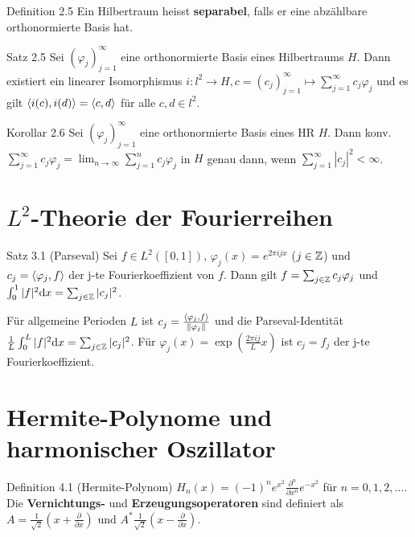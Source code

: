 \begin{namedtheorem}{Definition 2.5}
  Ein Hilbertraum heisst \textbf{separabel}, falls er eine abzählbare orthonormierte Basis hat.
\end{namedtheorem}

\begin{namedtheorem}{Satz 2.5}
  Sei $(\varphi_j)_{j=1}^{\infty}$ eine orthonormierte Basis eines Hilbertraums $H$. Dann existiert ein linearer Isomorphismus $i:l^2\rightarrow H,c=(c_j)_{j=1}^{\infty}\mapsto\sum_{j=1}^{\infty}c_j\varphi_j$ und es gilt $\langle i(c),i(d) \rangle=\langle c,d \rangle$ für alle $c,d\in l^2$. 
\end{namedtheorem}

\begin{namedtheorem}{Korollar 2.6}
  Sei $(\varphi_j)_{j=1}^{\infty}$ eine orthonormierte Basis eines HR $H$. Dann konv. $\sum_{j=1}^{\infty}c_j\varphi_j=\lim_{n\rightarrow\infty}\sum_{j=1}^nc_j\varphi_j$ in $H$ genau dann, wenn $\sum_{j=1}^{\infty}|c_j|^2<\infty$.
\end{namedtheorem}

\section{$L^2$-Theorie der Fourierreihen}

\begin{namedtheorem}{Satz 3.1 (Parseval)}
  Sei $f\in L^2([0,1])$, $\varphi_j(x) = e^{2\pi ijx}$ ($j\in\mathbb{Z}$) und $c_j=\langle \varphi_j,f \rangle$ der j-te Fourierkoeffizient von $f$. Dann gilt $f=\sum_{j\in\mathbb{Z}}c_j\varphi_j$ und $\int_0^1|f|^2\mathrm{d} x = \sum_{j\in\mathbb{Z}}|c_j|^2$.
\end{namedtheorem}

Für allgemeine Perioden $L$ ist $c_j=\frac{\langle \varphi_j,f \rangle}{\lVert\varphi_j\rVert}$ und die Parseval-Identität $\frac1L\int_{0}^{L}|f|^2\mathrm{d} x = \sum_{j\in\mathbb{Z}}|c_j|^2$. Für $\varphi_j(x)=\exp(\frac{2\pi i j}{L}x)$ ist $c_j=f_j$ der j-te Fourierkoeffizient.

\section{Hermite-Polynome und harmonischer Oszillator}

\begin{namedtheorem}{Definition 4.1 (Hermite-Polynom)}
  $H_n(x) = (-1)^ne^{x^2}\frac{\partial^n}{\partial x^n} e^{-x^2}$ für $n=0,1,2,\ldots$. Die \textbf{Vernichtungs-} und \textbf{Erzeugungsoperatoren} sind definiert als $A=\frac1{\sqrt2}(x+\frac{\partial}{\partial x})$ und $A^{\ast}\frac1{\sqrt2}(x-\frac{\partial}{\partial x})$.
\end{namedtheorem}

